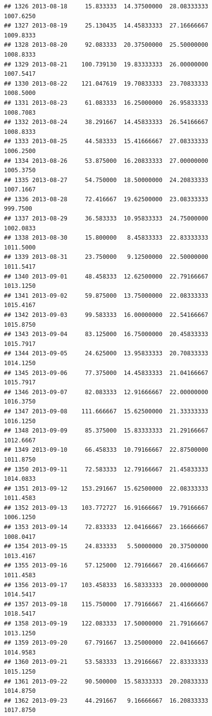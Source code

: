 \documentclass[
]{article}
\begin{document}
\begin{verbatim}
## 1326 2013-08-18     15.833333  14.37500000  28.08333333    1007.6250
## 1327 2013-08-19     25.130435  14.45833333  27.16666667    1009.8333
## 1328 2013-08-20     92.083333  20.37500000  25.50000000    1008.8333
## 1329 2013-08-21    100.739130  19.83333333  26.00000000    1007.5417
## 1330 2013-08-22    121.047619  19.70833333  23.70833333    1008.5000
## 1331 2013-08-23     61.083333  16.25000000  26.95833333    1008.7083
## 1332 2013-08-24     38.291667  14.45833333  26.54166667    1008.8333
## 1333 2013-08-25     44.583333  15.41666667  27.08333333    1006.2500
## 1334 2013-08-26     53.875000  16.20833333  27.00000000    1005.3750
## 1335 2013-08-27     54.750000  18.50000000  24.20833333    1007.1667
## 1336 2013-08-28     72.416667  19.62500000  23.08333333     999.7500
## 1337 2013-08-29     36.583333  10.95833333  24.75000000    1002.0833
## 1338 2013-08-30     15.800000   8.45833333  22.83333333    1011.5000
## 1339 2013-08-31     23.750000   9.12500000  22.50000000    1011.5417
## 1340 2013-09-01     48.458333  12.62500000  22.79166667    1013.1250
## 1341 2013-09-02     59.875000  13.75000000  22.08333333    1015.4167
## 1342 2013-09-03     99.583333  16.00000000  22.54166667    1015.8750
## 1343 2013-09-04     83.125000  16.75000000  20.45833333    1015.7917
## 1344 2013-09-05     24.625000  13.95833333  20.70833333    1014.1250
## 1345 2013-09-06     77.375000  14.45833333  21.04166667    1015.7917
## 1346 2013-09-07     82.083333  12.91666667  22.00000000    1016.3750
## 1347 2013-09-08    111.666667  15.62500000  21.33333333    1016.1250
## 1348 2013-09-09     85.375000  15.83333333  21.29166667    1012.6667
## 1349 2013-09-10     66.458333  10.79166667  22.87500000    1011.8750
## 1350 2013-09-11     72.583333  12.79166667  21.45833333    1014.0833
## 1351 2013-09-12    153.291667  15.62500000  22.08333333    1011.4583
## 1352 2013-09-13    103.772727  16.91666667  19.79166667    1006.1250
## 1353 2013-09-14     72.833333  12.04166667  23.16666667    1008.0417
## 1354 2013-09-15     24.833333   5.50000000  20.37500000    1013.4167
## 1355 2013-09-16     57.125000  12.79166667  20.41666667    1011.4583
## 1356 2013-09-17    103.458333  16.58333333  20.00000000    1014.5417
## 1357 2013-09-18    115.750000  17.79166667  21.41666667    1018.5417
## 1358 2013-09-19    122.083333  17.50000000  21.79166667    1013.1250
## 1359 2013-09-20     67.791667  13.25000000  22.04166667    1014.9583
## 1360 2013-09-21     53.583333  13.29166667  22.83333333    1015.1250
## 1361 2013-09-22     90.500000  15.58333333  20.20833333    1014.8750
## 1362 2013-09-23     44.291667   9.16666667  16.20833333    1017.8750

\end{verbatim}
\end{document}
